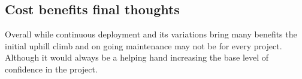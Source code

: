 \subsection{Cost benefits final thoughts}

Overall while continuous deployment and its variations bring many benefits the initial uphill climb and on going maintenance may not be for every project. Although it would always be a helping hand increasing the base level of confidence in the project.
